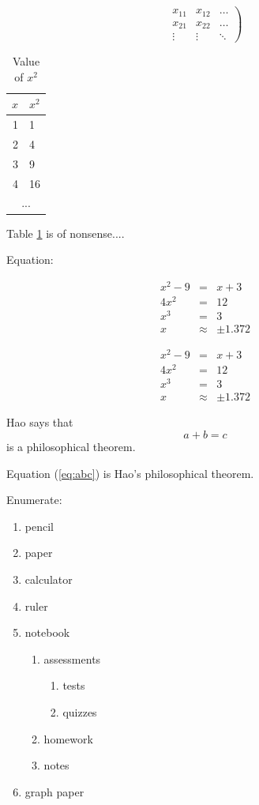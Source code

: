 \documentclass[11pt]{article}
\begin{document}
\[
\left.
\begin{array}{c|c||c}
x_{11} & x_{12} & \ldots \\
\hline
x_{21} & x_{22} & \ldots \\
\hline\hline
\vdots & \vdots & \ddots
\end{array}
\right)
\]

\begin{table}[htbp]
\centering
\begin{tabular}{|r||l|}
    \hline
    $x$ & $x^2$ \\
    \hline \hline
    1 & 1  \\ \hline
    2 & 4  \\ \cline{1-1}
    3 & 9  \\ \hline
    4 & 16 \\ \hline
    \multicolumn{2}{|c|}{...}\\ \hline
\end{tabular}
\caption{Value of $x^2$}
\label{tab:square}
\end{table}
Table \ref{tab:square} is of nonsense....

Equation:

\begin{eqnarray}
x^2-9&=&x+3\\
4x^2&=&12\\
x^3&=&3\\
x&\approx&\pm1.372
\end{eqnarray}

\begin{eqnarray*}
x^2-9&=&x+3\\
4x^2&=&12\\
x^3&=&3\\
x&\approx&\pm1.372
\end{eqnarray*}

Hao says that
\begin{equation}
a+b=c
\label{eq:abc}
\end{equation}
is a philosophical theorem.

Equation (\ref{eq:abc}) is Hao's philosophical theorem.

Enumerate:

\begin{enumerate}
\item pencil
\item paper
\item calculator
\item ruler
\item notebook
	\begin{enumerate}
	\item assessments
		\begin{enumerate}
		\item tests
		\item quizzes
		\end{enumerate}
	\item homework
	\item notes
	\end{enumerate}
\item graph paper
\end{enumerate}
\end{document}
